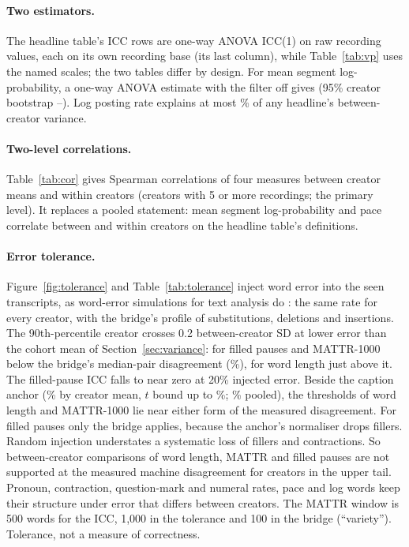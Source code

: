 \paragraph{Two estimators.} The headline table's ICC rows are one-way ANOVA ICC(1) on raw recording values, each on its
own recording base (its last column), while Table~\ref{tab:vp} uses the named scales; the two tables differ by design.
For mean segment log-probability, a one-way ANOVA estimate with the filter off gives \IccSegLogpAnova{} (95\% creator
bootstrap \IccSegLogpAnovaLo--\IccSegLogpAnovaHi). Log posting rate explains at most \PostingRateMaxPct\% of any
headline's between-creator variance.

\paragraph{Two-level correlations.} Table~\ref{tab:cor} gives Spearman correlations of four measures between creator
means and within creators (creators with 5 or more recordings; the primary level). It replaces a pooled statement:
mean segment log-probability and pace correlate \CorSegLogpPaceBetween{} between and \CorSegLogpPaceWithin{} within
creators on the headline table's definitions.

\paragraph{Error tolerance.} Figure~\ref{fig:tolerance} and Table~\ref{tab:tolerance} inject word error into the seen
transcripts, as word-error simulations for text analysis do \citep{proksch2019testing}: the same rate for every creator,
with the bridge's profile of substitutions, deletions and insertions. The 90th-percentile creator crosses 0.2
between-creator SD at lower error than the cohort mean of Section~\ref{sec:variance}: for filled pauses and MATTR-1000
below the bridge's median-pair disagreement (\BridgeDisagreeMedianPct\%), for word length just above it. The
filled-pause ICC falls to near zero at 20\% injected error. Beside the caption anchor (\AnchorCaptionMeanPct\% by
creator mean, $t$ bound up to \AnchorCaptionMeanTHi\%; \AnchorCaptionPooledPct\% pooled), the thresholds of word length
and MATTR-1000 lie near either form of the measured disagreement. For filled pauses only the bridge applies, because the
anchor's normaliser drops fillers. Random injection understates a systematic loss of fillers and contractions. So
between-creator comparisons of word length, MATTR and filled pauses are not supported at the measured machine
disagreement for creators in the upper tail. Pronoun, contraction, question-mark and numeral rates, pace and log words
keep their structure under error that differs between creators. The MATTR window is 500 words for the ICC, 1,000 in the
tolerance and 100 in the bridge (``variety''). Tolerance, not a measure of correctness.

